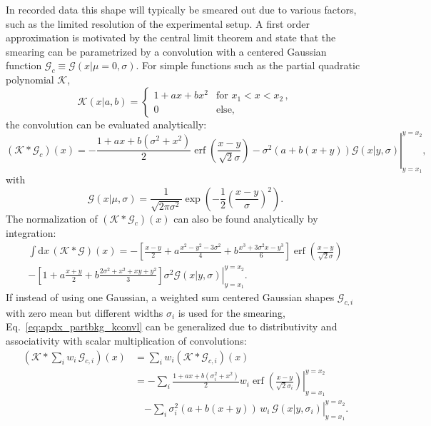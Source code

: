 In recorded data this shape will typically be smeared out due to various factors, such as the limited resolution of the experimental setup.
A first order approximation is motivated by the central limit theorem and state that the smearing can be parametrized by a convolution with a centered Gaussian function $\mathcal{G}_c \equiv \mathcal{G}(x|\mu=0,\sigma)$.
For simple functions such as the partial quadratic polynomial $\mathcal{K}$,
\begin{equation*}
    \mathcal{K}(x|a,b) = \begin{cases}
        1 + ax + bx^2 &\text{for } x_1 < x < x_2 \,, \\
        0 & \text{else},
    \end{cases}
\end{equation*}
the convolution can be evaluated analytically:
\begin{equation}
    \label{eq:apdx_partbkg_kconvl}
    (\mathcal{K} * \mathcal{G}_c)(x) = \left. -\frac{1 + ax + b \left( \sigma^2 + x^2 \right)}{2} \operatorname{erf} \left( \frac{x-y}{\sqrt{2} \sigma} \right) - \sigma^2 \left(a + b(x + y) \right) \mathcal{G}(x|y, \sigma) \right|_{y=x_1}^{y=x_2},
\end{equation}
with
\begin{equation*}
    \mathcal{G}(x|\mu,\sigma) = \frac{1}{\sqrt{2 \pi \sigma^2}} \exp \left( -\frac{1}{2} \left( \frac{x-y}{\sigma} \right)^2 \right).
\end{equation*}
The normalization of $(\mathcal{K} * \mathcal{G}_c)(x)$ can also be found analytically by integration:
\begin{multline*}
    \int \!\mathrm{d}x \, (\mathcal{K} * \mathcal{G})(x) = -\left[ \frac{x-y}{2} + a \frac{x^2 - y^2 - 3\sigma^2}{4} + b \frac{x^3 + 3\sigma^2 x - y^3}{6} \right] \operatorname{erf} \left( \frac{x - y}{\sqrt{2} \sigma} \right) \\
    \left.- \left[ 1 + a \frac{x + y}{2} + b \frac{2\sigma^2 + x^2 + xy + y^2}{3} \right] \sigma^2 \mathcal{G}(x|y, \sigma) \right|_{y=x_1}^{y=x_2}.
\end{multline*}
If instead of using one Gaussian, a weighted sum centered Gaussian shapes $\mathcal{G}_{c,i}$ with zero mean but different widths $\sigma_i$ is used for the smearing, Eq.~\eqref{eq:apdx_partbkg_kconvl} can be generalized due to distributivity and associativity with scalar multiplication of convolutions:
\begin{align*}
    (\mathcal{K} * \sum_i w_i \, \mathcal{G}_{c,i})(x) &= \sum_i w_i (\mathcal{K} * \mathcal{G}_{c,i})(x) \\
    &= \left. - \sum_i \frac{1 + ax + b \left( \sigma_i^2 + x^2 \right)}{2} w_i \operatorname{erf} \left( \frac{x-y}{\sqrt{2} \sigma_i} \right) \right|_{y=x_1}^{y=x_2}\\
    & \quad \left. - \sum_i \sigma_i^2 \left(a + b(x + y) \right) \, w_i \, \mathcal{G}(x|y, \sigma_i) \right|_{y=x_1}^{y=x_2}.
\end{align*}
